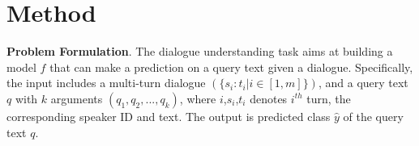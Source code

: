 \section{Method}
\vspace{-0.15cm}
\textbf{Problem Formulation}. The dialogue understanding task aims at building a model $f$ that can make a prediction on a query text given a dialogue. Specifically, the input includes a multi-turn dialogue $(\{s_i:t_i|i\in[1,m]\})$, and a query text $q$ with $k$ arguments $(q_1,q_2,...,q_k)$, where $i$,$s_i$,$t_i$ denotes $i^{th}$ turn, the corresponding speaker ID and text. The output is predicted class $\hat y$ of the query text $q$.


